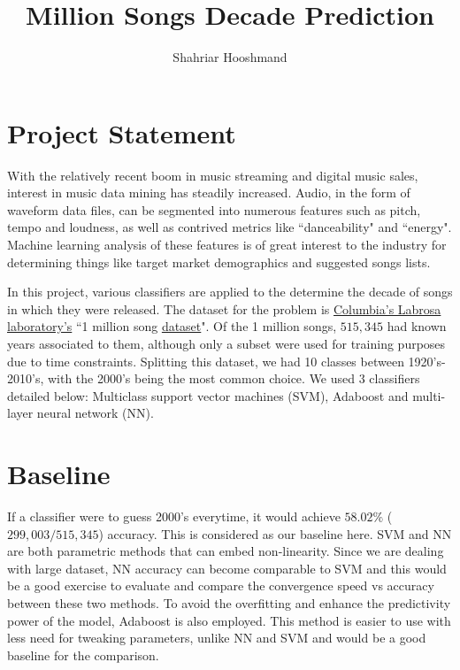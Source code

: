 \documentclass{article}
\title{Million Songs Decade Prediction}
\author{Shahriar Hooshmand}
\begin{document}
\maketitle

\section*{Project Statement}

With the relatively recent boom in music streaming and digital music sales, interest in music data mining has steadily increased. Audio, in the form of waveform data files, can be segmented into numerous features such as pitch, tempo and loudness, as well as contrived metrics like ``danceability" and ``energy". Machine learning analysis of these features is of great interest to the industry for determining things like target market demographics and suggested songs lists. 

\noindent In this project, various classifiers are applied to the determine the decade of songs in which they were released. The dataset for the problem is \href{http://millionsongdataset.com}{Columbia's Labrosa laboratory's} ``1 million song \href{https://archive.ics.uci.edu/ml/datasets/yearpredictionmsd}{dataset}". Of the 1 million songs, $515,345$ had known years associated to them, although only a subset were used for training purposes due to time constraints. Splitting this dataset, we had 10 classes between 1920's-2010's, with the 2000's being the most common choice. We used $3$ classifiers detailed below: Multiclass support vector machines (SVM), Adaboost and multi-layer neural network (NN). 

\section*{Baseline}

If a classifier were to guess 2000's everytime, it would achieve $58.02\%$ ($299,003/515,345$) accuracy. This is considered as our baseline here. SVM and NN are both parametric methods that can embed non-linearity. Since we are dealing with large dataset, NN accuracy can become comparable to SVM and this would be a good exercise to evaluate and compare the convergence speed vs accuracy between these two methods. To avoid the overfitting and enhance the predictivity power of the model, Adaboost is also employed. This method is easier to use with less need for tweaking parameters, unlike NN and SVM and would be a good baseline for the comparison. 
\end{document}
